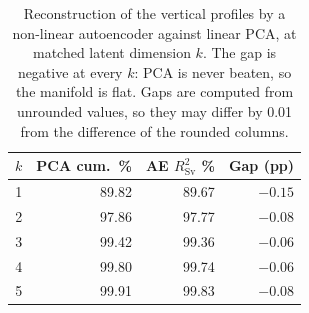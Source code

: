 \begin{table}[!ht]
    \centering
    \small
    \caption[Autoencoder versus PCA at matched latent dimension.]{Reconstruction
    of the vertical profiles by a non-linear autoencoder against linear PCA, at
    matched latent dimension $k$. The gap is negative at every $k$: PCA is never
    beaten, so the manifold is flat. Gaps are computed from unrounded values, so
    they may differ by 0.01 from the difference of the rounded columns.}
    \label{tab:ae-gap}
    \begin{tabular}{@{}crrr@{}}
        \toprule
        \textbf{$k$} & \textbf{PCA cum.\ \%} & \textbf{AE $R^2_{\mathrm{Sv}}$ \%} & \textbf{Gap (pp)} \\
        \midrule
        1 & 89.82 & 89.67 & $-0.15$ \\
        2 & 97.86 & 97.77 & $-0.08$ \\
        3 & 99.42 & 99.36 & $-0.06$ \\
        4 & 99.80 & 99.74 & $-0.06$ \\
        5 & 99.91 & 99.83 & $-0.08$ \\
        \bottomrule
    \end{tabular}
\end{table}
